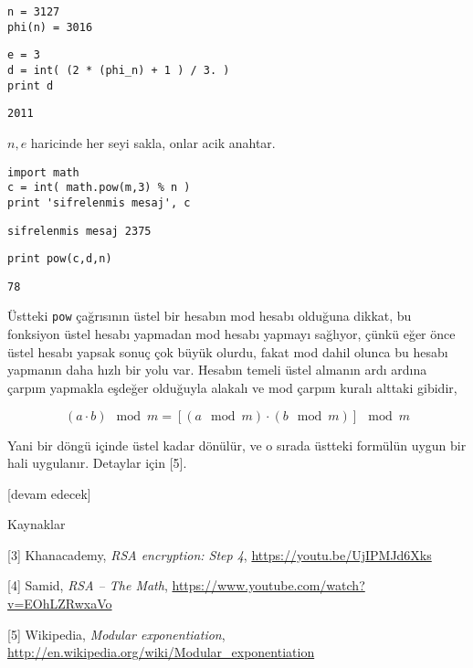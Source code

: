 \documentclass[12pt,fleqn]{article}\usepackage{../../common}
\begin{document}
\begin{verbatim}
n = 3127
phi(n) = 3016
\end{verbatim}

\begin{verbatim}
e = 3
d = int( (2 * (phi_n) + 1 ) / 3. )
print d
\end{verbatim}

\begin{verbatim}
2011
\end{verbatim}

$n,e$ haricinde her seyi sakla, onlar acik anahtar.

\begin{verbatim}
import math
c = int( math.pow(m,3) % n )
print 'sifrelenmis mesaj', c
\end{verbatim}

\begin{verbatim}
sifrelenmis mesaj 2375
\end{verbatim}

\begin{verbatim}
print pow(c,d,n)
\end{verbatim}

\begin{verbatim}
78
\end{verbatim}

Üstteki \verb!pow! çağrısının üstel bir hesabın mod hesabı olduğuna dikkat,
bu fonksiyon üstel hesabı yapmadan mod hesabı yapmayı sağlıyor, çünkü eğer
önce üstel hesabı yapsak sonuç çok büyük olurdu, fakat mod dahil olunca bu
hesabı yapmanın daha hızlı bir yolu var. Hesabın temeli üstel almanın ardı
ardına çarpım yapmakla eşdeğer olduğuyla alakalı ve mod çarpım kuralı
alttaki gibidir,

$$ 
(a \cdot b) \mod m = [(a \mod m) \cdot (b \mod m)] \mod m
$$

Yani bir döngü içinde üstel kadar dönülür, ve o sırada üstteki formülün
uygun bir hali uygulanır. Detaylar için [5]. 




[devam edecek]



Kaynaklar

[3] Khanacademy, {\em RSA encryption: Step 4}, \url{https://youtu.be/UjIPMJd6Xks}

[4] Samid, {\em RSA -- The Math}, \url{https://www.youtube.com/watch?v=EOhLZRwxaVo}

[5] Wikipedia, {\em Modular exponentiation}, \url{http://en.wikipedia.org/wiki/Modular_exponentiation}
\end{document}
